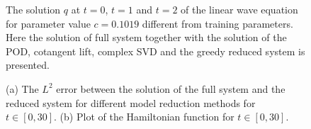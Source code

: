 \begin{figure}
\caption{The solution $q$ at $t=0$, $t=1$ and $t=2$ of the linear wave equation for parameter value $c= 0.1019$ different from training parameters. Here the solution of full system together with the solution of the POD, cotangent lift, complex SVD and the greedy reduced system is presented.}
\label{fig:NuRe:1}
\end{figure}

\begin{figure}

\begin{minipage}{.5\linewidth}
\centering
{}
\end{minipage}%
\begin{minipage}{.5\linewidth}
\centering
{}
\end{minipage}\par\medskip
\centering

\caption{{\edit (a) The $L^2$ error between the solution of the full system and the reduced system for different model reduction methods for $t \in [0,30]$.} (b) Plot of the Hamiltonian function for $t \in [0,30]$. }
\label{fig:NuRe:2}
\end{figure}


